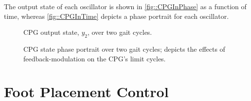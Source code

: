 			The output state of each \Ith oscillator is shown in \ref{fig::CPGInPhase} as a function of time, whereas \ref{fig::CPGInTime} depicts a phase portrait for each \Ith oscillator.  	%
			\begin{figure}[h!]
				\centering
				\caption{CPG output state, $y_{2}$, over two gait cycles.}
				\label{fig::cpg_phase80}
			\end{figure}
			\begin{figure}[h!]
				\centering
				\caption{CPG state phase portrait over two gait cycles; depicts the effects of feedback-modulation on the CPG's limit cycles.}
				\label{fig::cpg_phase80}
			\end{figure}	%



	\section{Foot Placement Control}


